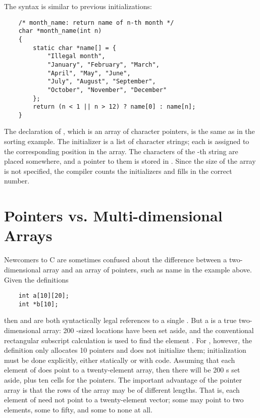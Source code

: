 The syntax is similar to previous initializations:
\begin{lstlisting}
    /* month_name: return name of n-th month */
    char *month_name(int n)
    {
        static char *name[] = {
            "Illegal month",
            "January", "February", "March",
            "April", "May", "June",
            "July", "August", "September",
            "October", "November", "December"
        };
        return (n < 1 || n > 12) ? name[0] : name[n];
    }
\end{lstlisting}
The declaration of , which is an array of character pointers, is the same as  in the sorting example.
The initializer is a list of character strings; each is assigned to the corresponding position in the array.
The characters of the -th string are placed somewhere, and a pointer to them is stored in .
Since the size of the array  is not specified, the compiler counts the initializers and fills in the correct number.



\section{Pointers vs. Multi-dimensional Arrays}


Newcomers to C are sometimes confused about the difference between a two-dimensional array and an array of pointers, such as name in the example above.
Given the definitions
\begin{lstlisting}
    int a[10][20];
    int *b[10];
\end{lstlisting}
then  and  are both syntactically legal references to a single .
But a is a true two-dimensional array: 200 -sized locations have been set aside, and the conventional rectangular subscript calculation  is used to find the element .
For , however, the definition only allocates 10 pointers and does not initialize them; initialization must be done explicitly, either statically or with code.
Assuming that each element of  does point to a twenty-element array, then there will be 200 s set aside, plus ten cells for the pointers.
The important advantage of the pointer array is that the rows of the array may be of different lengths.
That is, each element of  need not point to a twenty-element vector; some may point to two elements, some to fifty, and some to none at all.

